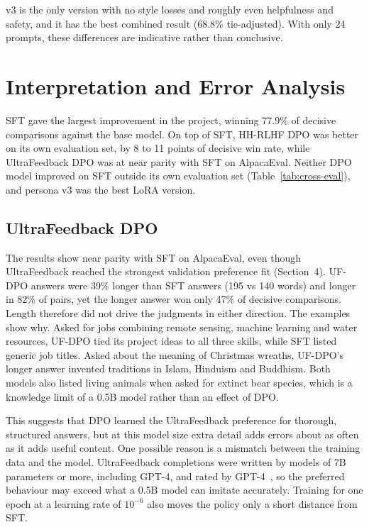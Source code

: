 \documentclass[10pt,a4paper]{article}
\begin{document}
v3 is the only version with no style losses and roughly even helpfulness and safety, and it has the best combined result (68.8\% tie-adjusted). With only 24 prompts, these differences are indicative rather than conclusive.

\section{Interpretation and Error Analysis}\label{sec:interp}

SFT gave the largest improvement in the project, winning 77.9\% of decisive comparisons against the base model. On top of SFT, HH-RLHF DPO was better on its own evaluation set, by 8 to 11 points of decisive win rate, while UltraFeedback DPO was at near parity with SFT on AlpacaEval. Neither DPO model improved on SFT outside its own evaluation set (Table~\ref{tab:cross-eval}), and persona v3 was the best LoRA version.

\subsection{UltraFeedback DPO}

The results show near parity with SFT on AlpacaEval, even though UltraFeedback reached the strongest validation preference fit (Section~4). UF-DPO answers were 39\% longer than SFT answers (195 vs 140 words) and longer in 82\% of pairs, yet the longer answer won only 47\% of decisive comparisons. Length therefore did not drive the judgments in either direction. The examples show why. Asked for jobs combining remote sensing, machine learning and water resources, UF-DPO tied its project ideas to all three skills, while SFT listed generic job titles. Asked about the meaning of Christmas wreaths, UF-DPO's longer answer invented traditions in Islam, Hinduism and Buddhism. Both models also listed living animals when asked for extinct bear species, which is a knowledge limit of a 0.5B model rather than an effect of DPO.

This suggests that DPO learned the UltraFeedback preference for thorough, structured answers, but at this model size extra detail adds errors about as often as it adds useful content. One possible reason is a mismatch between the training data and the model. UltraFeedback completions were written by models of 7B parameters or more, including GPT-4, and rated by GPT-4~\cite{cui2024}, so the preferred behaviour may exceed what a 0.5B model can imitate accurately. Training for one epoch at a learning rate of $10^{-6}$ also moves the policy only a short distance from SFT.
\end{document}
